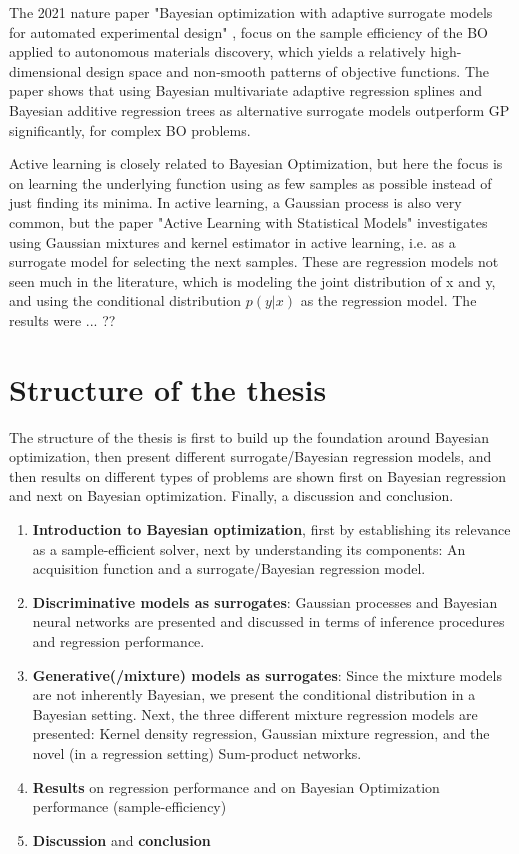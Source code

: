 The 2021 nature paper "Bayesian optimization with adaptive surrogate models for automated experimental design"
\cite{Nature_BO_paper}, focus on the sample efficiency of the BO applied to autonomous materials discovery, 
which yields a relatively high-dimensional design space and non-smooth patterns of objective functions.  
The paper shows that using Bayesian multivariate adaptive regression splines
and Bayesian additive regression trees as alternative surrogate models outperform GP significantly, 
for complex BO problems. 

Active learning is closely related to Bayesian Optimization, but here the focus is on learning the
underlying function using as few samples as possible instead of just finding its minima. In active
learning, a Gaussian process is also very common, but the paper "Active Learning with Statistical
Models" \cite{ALStatisticalModels} investigates using Gaussian mixtures and kernel estimator in
active learning, i.e. as a surrogate model for selecting the next samples. These are regression
models not seen much in the literature, which is modeling the joint distribution of x and y, and
using the conditional distribution $p(y|x)$ as the regression model. The results were ... ??

\section{Structure of the thesis}
The structure of the thesis is first to build up the foundation around Bayesian optimization, then
present different surrogate/Bayesian regression models, and then results on different types of
problems are shown first on Bayesian regression and next on Bayesian optimization. Finally, a discussion and conclusion. 

\begin{enumerate}[noitemsep]
    \item \textbf{Introduction to Bayesian optimization}, first by establishing its relevance as a
    sample-efficient solver, next by understanding its components: An acquisition function and a 
    surrogate/Bayesian regression model.
    \item \textbf{Discriminative models as surrogates}: Gaussian processes and Bayesian neural
    networks are presented and discussed in terms of inference procedures and regression performance. 
    \item \textbf{Generative(/mixture) models as surrogates}: Since the mixture models are not 
    inherently Bayesian, we present the conditional distribution in a Bayesian setting. 
    Next, the three different mixture regression models are presented: Kernel density regression, Gaussian mixture regression,
    and the novel (in a regression setting) Sum-product networks.
    \item \textbf{Results} on regression performance and on Bayesian Optimization performance (sample-efficiency)
    \item \textbf{Discussion} and \textbf{conclusion}
\end{enumerate}

